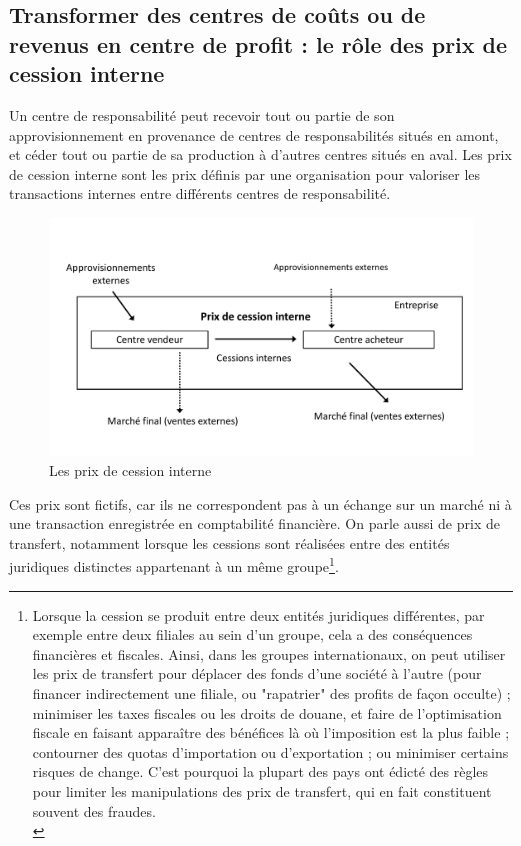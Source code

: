 \documentclass{tufte-handout}
\begin{document}
\subsection{Transformer des centres de coûts ou de revenus en centre de profit : le rôle des prix de cession interne}
\label{sec:orga745fc6}
Un centre de responsabilité peut recevoir tout ou partie de son approvisionnement en provenance de centres de responsabilités situés en amont, et céder tout ou partie de sa production à d’autres centres situés en aval. Les prix de cession interne sont les prix définis par une organisation pour valoriser les transactions internes entre différents centres de responsabilité.\\
\begin{figure}[htbp]
\centering
\includegraphics[width=.9\linewidth]{./img/pci.pdf}
\caption{Les prix de cession interne}
\end{figure}
Ces prix sont fictifs, car ils ne correspondent pas à un échange sur un marché ni à une transaction enregistrée en comptabilité financière. On parle aussi de prix de transfert, notamment lorsque les cessions sont réalisées entre des entités juridiques distinctes appartenant à un même groupe\footnote{Lorsque la cession se produit entre deux entités juridiques différentes, par exemple entre deux filiales au sein d’un groupe, cela a des conséquences financières et fiscales. Ainsi, dans les groupes internationaux, on peut utiliser les prix de transfert pour déplacer des fonds d’une société à l’autre (pour financer indirectement une filiale, ou "rapatrier" des profits de façon occulte) ; minimiser les taxes fiscales ou les droits de douane, et faire de l’optimisation fiscale en faisant apparaître des bénéfices là où l’imposition est la plus faible ; contourner des quotas d’importation ou d’exportation ; ou minimiser certains risques de change. C’est pourquoi la plupart des pays ont édicté des règles pour limiter les manipulations des prix de transfert, qui en fait constituent souvent des fraudes.\\}.\\
\end{document}
